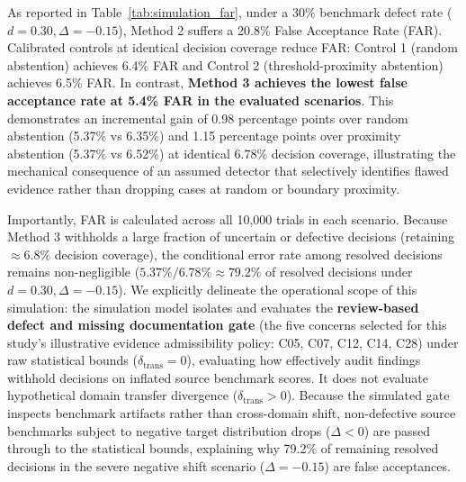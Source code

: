 \documentclass[runningheads]{llncs}
\begin{document}
As reported in Table~\ref{tab:simulation_far}, under a 30\% benchmark defect rate ($d = 0.30, \Delta = -0.15$), Method 2 suffers a 20.8\% False Acceptance Rate (FAR). Calibrated controls at identical decision coverage reduce FAR: Control 1 (random abstention) achieves 6.4\% FAR and Control 2 (threshold-proximity abstention) achieves 6.5\% FAR. In contrast, \textbf{Method 3 achieves the lowest false acceptance rate at 5.4\% FAR in the evaluated scenarios}. This demonstrates an incremental gain of 0.98 percentage points over random abstention (5.37\% vs 6.35\%) and 1.15 percentage points over proximity abstention (5.37\% vs 6.52\%) at identical 6.78\% decision coverage, illustrating the mechanical consequence of an assumed detector that selectively identifies flawed evidence rather than dropping cases at random or boundary proximity.

Importantly, FAR is calculated across all 10,000 trials in each scenario. Because Method 3 withholds a large fraction of uncertain or defective decisions (retaining $\approx 6.8\%$ decision coverage), the conditional error rate among resolved decisions remains non-negligible ($5.37\% / 6.78\% \approx 79.2\%$ of resolved decisions under $d = 0.30, \Delta = -0.15$). We explicitly delineate the operational scope of this simulation: the simulation model isolates and evaluates the \textbf{review-based defect and missing documentation gate} (the five concerns selected for this study's illustrative evidence admissibility policy: C05, C07, C12, C14, C28) under raw statistical bounds ($\delta_{\text{trans}} = 0$), evaluating how effectively audit findings withhold decisions on inflated source benchmark scores. It does not evaluate hypothetical domain transfer divergence ($\delta_{\text{trans}} > 0$). Because the simulated gate inspects benchmark artifacts rather than cross-domain shift, non-defective source benchmarks subject to negative target distribution drops ($\Delta < 0$) are passed through to the statistical bounds, explaining why 79.2\% of remaining resolved decisions in the severe negative shift scenario ($\Delta = -0.15$) are false acceptances. 
\end{document}
